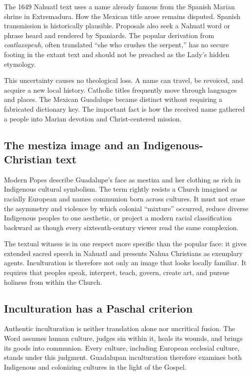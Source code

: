 The 1649 Nahuatl text uses a name already famous from the Spanish Marian shrine in Extremadura. How the Mexican title arose remains disputed. Spanish transmission is historically plausible. Proposals also seek a Nahuatl word or phrase heard and rendered by Spaniards. The popular derivation from \emph{coatlaxopeuh}, often translated “she who crushes the serpent,” has no secure footing in the extant text and should not be preached as the Lady's hidden etymology.

This uncertainty causes no theological loss. A name can travel, be revoiced, and acquire a new local history. Catholic titles frequently move through languages and places. The Mexican Guadalupe became distinct without requiring a fabricated dictionary key. The important fact is how the received name gathered a people into Marian devotion and Christ-centered mission.

\subsection{The mestiza image and an Indigenous-Christian text}

Modern Popes describe Guadalupe's face as mestiza and her clothing as rich in Indigenous cultural symbolism. The term rightly resists a Church imagined as racially European and names communion born across cultures. It must not erase the asymmetry and violence by which colonial “mixture” occurred, reduce diverse Indigenous peoples to one aesthetic, or project a modern racial classification backward as though every sixteenth-century viewer read the same complexion.

The textual witness is in one respect more specific than the popular face: it gives extended sacred speech in Nahuatl and presents Nahua Christians as exemplary agents. Inculturation is therefore not only an image that looks locally familiar. It requires that peoples speak, interpret, teach, govern, create art, and pursue holiness from within the Church.

\subsection{Inculturation has a Paschal criterion}

Authentic inculturation is neither translation alone nor uncritical fusion. The Word assumes human culture, judges sin within it, heals its wounds, and brings its goods into communion. Every culture, including European ecclesial culture, stands under this judgment. Guadalupan inculturation therefore examines both Indigenous and colonizing cultures in the light of the Gospel.

